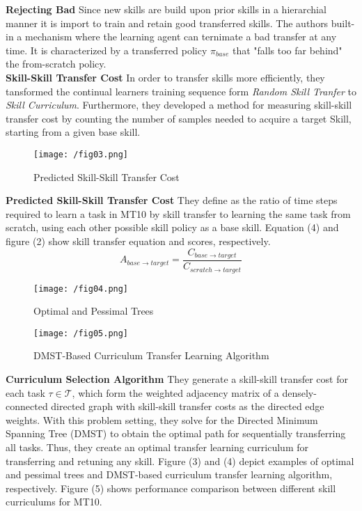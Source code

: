 \documentclass[12pt]{article}
\begin{document}
\noindent
\textbf{Rejecting Bad} Since new skills are build upon prior skills in a
hierarchial manner it is import to train and retain good transferred skills.
The authors built-in a mechanism where the learning agent can ternimate a
bad transfer at any time. It is characterized by a transferred policy \(\pi_{base}\)
that "falls too far behind" the from-scratch policy.\\

\noindent
\textbf{Skill-Skill Transfer Cost}
In order to transfer skills more efficiently, they tansformed the continual
learners training sequence form \textit{Random Skill Tranfer} to \textit{Skill
Curriculum}. Furthermore, they developed a method for measuring skill-skill
transfer cost by counting the number of samples needed to acquire a target Skill,
starting from a given base skill.\\

\newpage

\begin{figure}[h]
  \centering
  \texttt{[image: /fig03.png]}
  \caption{Predicted Skill-Skill Transfer Cost}
\end{figure}

\noindent
\textbf{Predicted Skill-Skill Transfer Cost}
They define   as the ratio of time steps required to learn a task in MT10
\cite{meta-world} by skill transfer to learning the same task from scratch, using each
other possible skill policy as a base skill. Equation (4) and figure (2) show
skill transfer equation and scores, respectively.\\

\begin{equation}
A_{base \rightarrow target} = \frac{C_{base \rightarrow target}}{C_{scratch\rightarrow target}}
\end{equation}

\begin{figure}[h]
  \centering
  \texttt{[image: /fig04.png]}
  \caption{Optimal and Pessimal Trees}
\end{figure}

\begin{figure}[h]
  \centering
  \texttt{[image: /fig05.png]}
  \caption{DMST-Based Curriculum Transfer Learning Algorithm}
\end{figure}

\noindent
\textbf{Curriculum Selection Algorithm}
They generate a skill-skill transfer cost for each task \(\tau \in \mathcal{T}\), which
form the weighted adjacency matrix of a densely-connected directed graph with
skill-skill transfer costs as the directed edge weights. With this problem
setting,
they solve for the Directed Minimum Spanning Tree (DMST) to obtain the optimal
path for sequentially transferring all tasks.
Thus, they create an optimal transfer learning curriculum for transferring and
retuning any skill. Figure (3) and (4) depict examples of optimal and pessimal trees
and DMST-based curriculum transfer learning algorithm, respectively.
Figure (5)
shows performance comparison between different skill curriculums for MT10.\\
\end{document}
